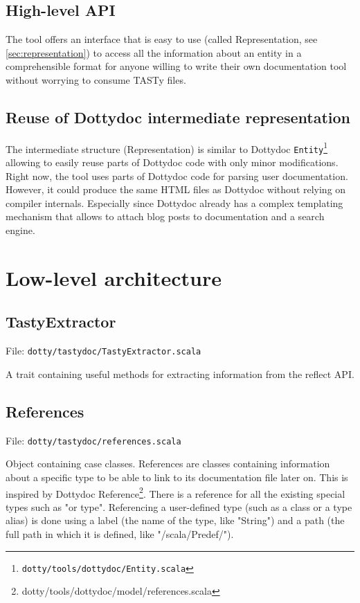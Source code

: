 \documentclass{report}
\begin{document}
\subsection{High-level API}
The tool offers an interface that is easy to use (called Representation, see \autoref{sec:representation}) to access all the information about an entity in a comprehensible format for anyone willing to write their own documentation tool without worrying to consume TASTy files.

\subsection{Reuse of Dottydoc intermediate representation}
The intermediate structure (Representation) is similar to Dottydoc \texttt{Entity}\footnote{\texttt{dotty/tools/dottydoc/Entity.scala}} allowing to easily reuse parts of Dottydoc code with only minor modifications. Right now, the tool uses parts of Dottydoc code for parsing user documentation. However, it could produce the same HTML files as Dottydoc without relying on compiler internals. Especially since Dottydoc already has a complex templating mechanism that allows to attach blog posts to documentation and a search engine.

\section{Low-level architecture}
\subsection{TastyExtractor}
File: \texttt{dotty/tastydoc/TastyExtractor.scala}

A trait containing useful methods for extracting information from the reflect API.

\subsection{References}
File: \texttt{dotty/tastydoc/references.scala}

Object containing case classes. References are classes containing information about a specific type to be able to link to its documentation file later on. This is inspired by Dottydoc Reference\footnote{dotty/tools/dottydoc/model/references.scala}. There is a reference for all the existing special types such as "or type". Referencing a user-defined type (such as a class or a type alias) is done using a label (the name of the type, like "String") and a path (the full path in which it is defined, like "/scala/Predef/").
\end{document}
